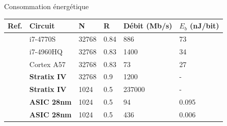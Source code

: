 \begin{frame}[c]{Consommation énergétique}
{\begin{table}[t]
\begin{tabular}{C{0.9cm}|C{1.9cm}|C{1cm}|C{0.7cm}|C{1.7cm}|C{1.5cm}}
	Ref.           & \textbf{Circuit} &  N                     & R                       & Débit (Mb/s) & $E_b$ (nJ/bit)  \\\hline
	\cite{Giard15} & i7-4770S   &  32768                 & 0.84                          & 886        & 73                       \\
	\cite{6960078} & i7-4960HQ  &  32768                 & 0.83                          & 1400       & 34                       \\
	\cite{7760327} & Cortex A57 &  32768                 & 0.83                          & 73         & 27                       \\\hline
	\cite{6804939} & \textbf{Stratix IV} &  32768                 & 0.9                  & 1200       & -               \\
	\cite{7105452} & \textbf{Stratix IV} &  1024\footnotemark[1]  & 0.5\footnotemark[1]  & 237000     & -               \\
	\cite{8017407} & \textbf{ASIC 28nm } &  1024                  & 0.5                  & 94         & 0.095           \\
	\cite{8017407} & \textbf{ASIC 28nm } &  1024\footnotemark[1]  & 0.5\footnotemark[1]  & 436        & 0.006           \\
	\end{tabular}
  \end{table}

	}
\end{frame}
